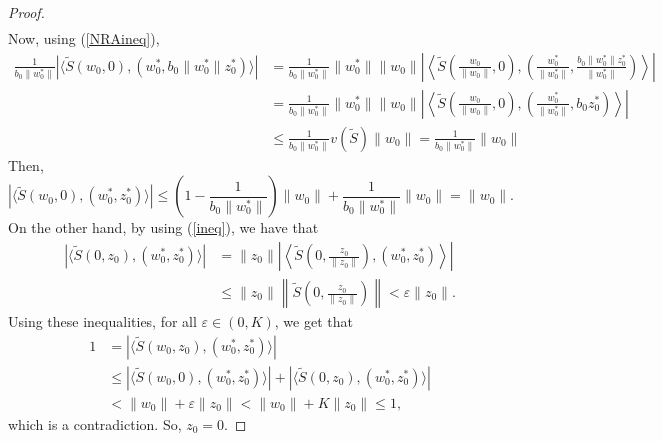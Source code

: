\documentclass[10pt,a4paper]{amsart}
\theoremstyle{plain}
\theoremstyle{definition}
\newcommand{\eps}{\varepsilon}
\renewcommand{\leq}{\leqslant}
\begin{document}
\begin{proof}
\begin{align*}
\end{align*}
Now, using (\ref{NRAineq}),
\begin{align*}
\frac{1}{b_0 \|w_0^*\|} | \langle \widetilde{S}(w_0, 0), (w_0^*, b_0 \|w_0^*\| z_0^*) \rangle | &= \frac{1}{b_0 \|w_0^*\|} \|w_0^*\|\|w_0\| \left| \left \langle \widetilde{S} \left( \frac{w_0}{\|w_0\|}, 0 \right), \left( \frac{w_0^*}{\|w_0^*\|}, \frac{b_0 \|w_0^*\| z_0^*}{\|w_0^*\|} \right) \right \rangle \right| \\
&= \frac{1}{b_0\|w_0^*\|} \|w_0^*\| \|w_0\| \left| \left \langle \widetilde{S} \left( \frac{w_0}{\|w_0\|}, 0 \right), \left( \frac{w_0^*}{\|w_0^*\|}, b_0 z_0^*\right) \right \rangle \right| \\
&\leq \frac{1}{b_0 \|w_0^*\|} v(\widetilde{S} )\|w_0\| = 	\frac{1}{b_0 \|w_0^*\|} \|w_0\|
\end{align*}
Then,
\begin{equation*}
| \langle \widetilde{S}(w_0, 0), (w_0^*, z_0^*) \rangle| \leq \left(1 - \frac{1}{b_0 \|w_0^*\|}\right) \|w_0\| + \frac{1}{b_0\|w_0^*\|}\|w_0\| = \|w_0\|.	
\end{equation*}
On the other hand, by using (\ref{ineq}), we have that
\begin{align*}
| \langle \widetilde{S}(0, z_0), (w_0^*, z_0^*) \rangle| &= \|z_0\|   \left| \left \langle \widetilde{S} \left(0, \frac{z_0}{\|z_0\|} \right), (w_0^*, z_0^*) \right \rangle \right|	\\
&\leq 	\|z_0\| \left\| \widetilde{S} \left(0, \frac{z_0}{\|z_0\|} \right) \right\| < \eps \|z_0\|.
\end{align*}
Using these inequalities, for all $\eps \in (0, K)$, we get that
\begin{align*}
1 &= | \langle \widetilde{S}(w_0, z_0), (w_0^*, z_0^*) \rangle| \\
&\leq |\langle \widetilde{S}(w_0, 0), (w_0^*, z_0^*) \rangle| + |\langle \widetilde{S}(0, z_0), (w_0^*, z_0^*) \rangle | \\
&< \|w_0\| + \eps \|z_0\| < \|w_0\| + K \|z_0\| \leq 1,
\end{align*}
which is a contradiction. So, $z_0 = 0$.

	
\vspace{0.3cm}	



\end{proof}
\end{document}
